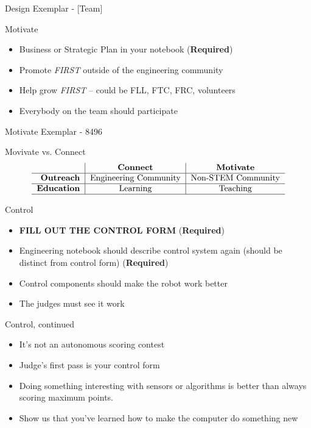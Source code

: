 \documentclass{beamer}
\begin{document}
  \begin{frame}{Design Exemplar - [Team]}
  \end{frame}

  \begin{frame}{Motivate}
    \begin{itemize}
    \item Business or Strategic Plan in your notebook (\textbf{Required})\pause
    \item Promote \textit{FIRST} outside of the engineering community \pause
    \item Help grow \textit{FIRST} -- could be FLL, FTC, FRC, volunteers \pause
    \item Everybody on the team should participate
    \end{itemize}
  \end{frame}


  \begin{frame}{Motivate Exemplar - 8496}
  \end{frame}

  \begin{frame}{Movivate vs. Connect}
    \[
    \begin{tabular}{r|c|c}
       & \textbf{Connect} & \textbf{Motivate} \\ \hline
      \textbf{Outreach} & Engineering Community & Non-STEM Community \\ \hline
      \textbf{Education} & Learning & Teaching \\
      \hline
    \end{tabular}
    \]
  \end{frame}

  \begin{frame}{Control}
    \begin{itemize}
    \item \textbf{FILL OUT THE CONTROL FORM} (\textbf{Required})\pause
    \item Engineering notebook should describe control system again \pause
      (should be distinct from control form) (\textbf{Required})\pause
    \item Control components should make the robot work better \pause
    \item The judges must see it work
    \end{itemize}
  \end{frame}

  \begin{frame}{Control, continued}
    \begin{itemize}
    \item It's not an autonomous scoring contest \pause
    \item Judge's first pass is your control form \pause
    \item Doing something interesting with sensors or algorithms
      is better than always scoring maximum points. \pause
    \item Show us that you've learned how to make the computer do
      something new
    \end{itemize}
  \end{frame}
\end{document}
